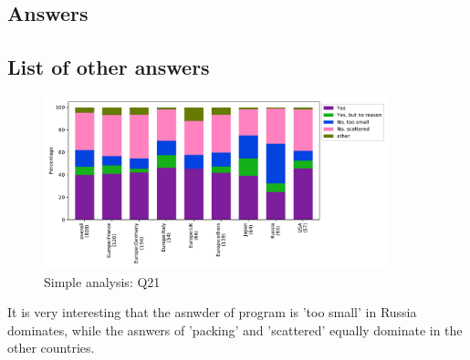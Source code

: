 
\subsection{Answers}


\subsection{List of other answers}
\begin{itemize}

\end{itemize}

\begin{figure}[htb]
\begin{center}
\includegraphics[width=10cm]{../pdfs/Q21.pdf}
\caption{Simple analysis: Q21}
\label{fig:Q21}
\end{center}
\end{figure}

It is very interesting that the asnwder of program is 'too small' in
Russia dominates, while the asnwers of 'packing' and 'scattered'
equally dominate in the other countries. 
